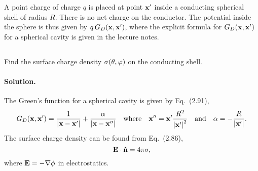 \documentclass[11pt]{article}
\newcommand{\beq}{\begin{equation*}}
\newcommand{\eeq}{\end{equation*}}
\newcommand{\beqn}{\begin{equation}}
\newcommand{\eeqn}{\end{equation}}
\newenvironment{statement}[1]
{
	\section{#1}
	\color{darkgray}
	\ignorespaces
}
{
}
\newenvironment{problem}
{
	\subsection{}
	\color{darkgray}
    \ignorespaces
}
{

}
\newenvironment{solution}
{
    \paragraph{Solution.}
    \ignorespaces
}
{
    \bigskip
}
\begin{document}
\begin{statement}{}
	A point charge of charge $q$ is placed at point $\mathbf{x}'$ inside a conducting spherical shell of radius $R$.  There is no net charge on the conductor.  The potential inside the sphere is thus given by $q \, G_D(\mathbf{x}, \mathbf{x}')$, where the explicit formula for $G_D(\mathbf{x}, \mathbf{x}')$ for a spherical cavity is given in the lecture notes.
\end{statement}

\begin{problem}
	Find the surface charge density $\sigma(\theta, \varphi)$ on the conducting shell.
\end{problem}

\begin{solution}
	The Green's function for a spherical cavity is given by Eq.~(2.91),
	\beq
		\Gdxxp = \frac{1}{\abs{\vx - \vx'}} + \frac{\alp}{\abs{\vx - \vx''}} \qq{where} \vx'' = \vx' \frac{R^2}{\absxp^2} \qand \alp = - \frac{R}{\absxp}.
	\eeq
	The surface charge density can be found from Eq.~(2.86),
	\beqn \label{scdeq}
		\vE \cdot \nh = 4\pi \sig,
	\eeqn
	where $\mathbf{E} = -\nabla \phi$ in electrostatics.
	

\end{solution}
\end{document}
